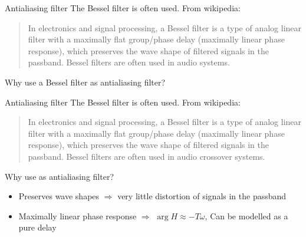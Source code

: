\documentclass[presentation,aspectratio=169]{beamer}
\begin{document}
\begin{frame}[label={sec:orgba81902}]{Antialiasing filter}
The \alert{Bessel filter} is often used. From wikipedia:
\begin{quote}
In electronics and signal processing, a Bessel filter is a type of analog linear filter with a maximally flat group/phase delay (maximally linear phase response), which preserves the wave shape of filtered signals in the passband. Bessel filters are often used in audio systems.
\end{quote}

Why use a Bessel filter as antialiasing filter?
\end{frame}


\begin{frame}[label={sec:org0f7beb3}]{Antialiasing filter}
The \alert{Bessel filter} is often used. From wikipedia:
\begin{quote}
In electronics and signal processing, a Bessel filter is a type of analog linear filter with a maximally flat group/phase delay (maximally linear phase response), which preserves the wave shape of filtered signals in the passband. Bessel filters are often used in audio crossover systems.
\end{quote}

Why use as antialiasing filter?
\begin{itemize}
\item Preserves wave shapes \(\Rightarrow\) very little distortion of signals in the passband
\item Maximally linear phase response \(\Rightarrow\) \(\arg H \approx -T\omega\),  Can be modelled as a pure delay
\end{itemize}
\end{frame}
\end{document}
